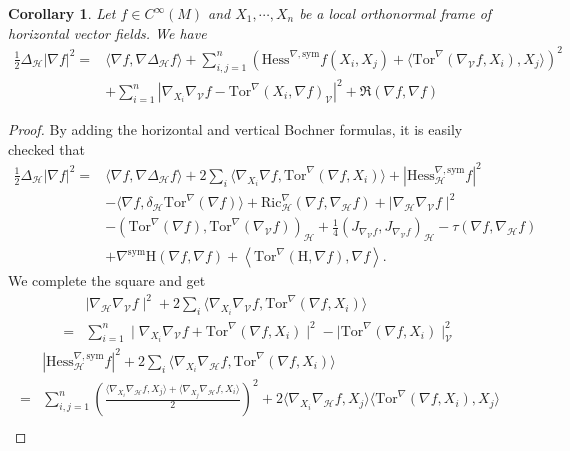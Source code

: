 \documentclass[11pt]{article}
\numberwithin{equation}{section}
\newtheorem{corollary}[theorem]{Corollary}
\newcommand{\Ho}{\mathcal H}
\newcommand{\V}{\mathcal V}
\newcommand{\Tor}{\mathrm{Tor}}
\begin{document}
	\begin{corollary}
		Let $f \in C^\infty (M)$ and  $X_1,\cdots,X_n$ be a local orthonormal frame of horizontal vector fields. We have
		\begin{align*}
			\frac{1}{2}\Delta_{\mathcal{H}} | \nabla f|^2=&\langle \nabla f , \nabla \Delta_{\mathcal{H}} f \rangle+\sum_{i,j=1}^n \left( \mathrm{Hess}^{\nabla, \mathrm{sym}} f(X_i , X_j)+\langle \Tor^\nabla(\nabla_\V f,X_i),X_j \rangle \right)^2 \\
			&+\sum_{i=1}^n |\nabla_{X_i} \nabla_\V f -\Tor^\nabla (X_i,\nabla f)_\V|^2+\mathfrak{R} (\nabla f,\nabla f)
		\end{align*}
	\end{corollary}
	\begin{proof}
	By adding the horizontal and vertical Bochner formulas, it is easily checked that
	\begin{align*}
		\frac{1}{2}\Delta_{\mathcal{H}} | \nabla f|^2=&\langle \nabla f , \nabla\Delta_{\mathcal{H}} f \rangle+2\sum_i\langle \nabla_{X_i} \nabla f, \mathrm{Tor}^\nabla(\nabla f, X_i) \rangle+| \mathrm{Hess}_\Ho^{\nabla, \mathrm{sym}} f|^2\\
		&- \langle \nabla f, \delta_\Ho \mathrm{Tor}^\nabla ( \nabla f ) \rangle+\mathrm{Ric}_\Ho^\nabla(\nabla f, \nabla_{\mathcal{H}} f )+\mid \nabla_{\mathcal{H}} \nabla_{\mathcal{V}} f \mid^2\\
		&-(\mathrm{Tor}^\nabla (\nabla f),\mathrm{Tor}^\nabla (\nabla_\V f) )_\Ho+\frac{1}{4}( J_{\nabla_\V f} , J_{\nabla_\V f} )_\Ho-\tau (\nabla f,\nabla_\Ho f) \\
        &+ \nabla^{\mathrm{sym}}\mathrm H(\nabla f,\nabla f)+\left\langle \mathrm{Tor}^\nabla (\mathrm H, \nabla f), \nabla f \right\rangle.
	\end{align*}
	We complete the square and get
\begin{align*}
&\mid \nabla_{\mathcal{H}} \nabla_{\mathcal{V}} f \mid^2+2\sum_i\langle \nabla_{X_i} \nabla_\V f, \mathrm{Tor}^\nabla(\nabla f, X_i) \rangle \\
=&\sum_{i=1}^n\mid \nabla_{X_i} \nabla_{\mathcal{V}} f +\mathrm{Tor}^\nabla(\nabla f, X_i)\mid^2-\mid \mathrm{Tor}^\nabla(\nabla f, X_i)\mid_\V^2
\end{align*}
\begin{align*}
&| \mathrm{Hess}_\Ho^{\nabla, \mathrm{sym}} f|^2+2\sum_i\langle \nabla_{X_i} \nabla_\Ho f, \mathrm{Tor}^\nabla(\nabla f, X_i) \rangle \\
=&\sum_{i,j=1}^n \left(\frac{\langle \nabla_{X_i} \nabla_\Ho f,X_j\rangle +\langle \nabla_{X_j} \nabla_\Ho f,X_i\rangle}{2} \right)^2+ 2 \langle \nabla_{X_i} \nabla_\Ho f,X_j\rangle \langle \mathrm{Tor}^\nabla(\nabla f, X_i),X_j \rangle \\

\end{align*}
\end{proof}
\end{document}
